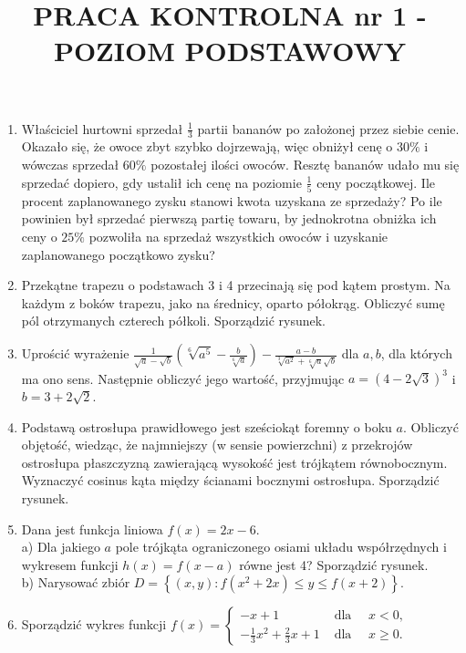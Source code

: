 \documentclass[10pt]{article}
\title{PRACA KONTROLNA nr 1 - POZIOM PODSTAWOWY }
\author{}
\date{}
\begin{document}
\maketitle
\begin{enumerate}
  \item Właściciel hurtowni sprzedał $\frac{1}{3}$ partii bananów po założonej przez siebie cenie. Okazało się, że owoce zbyt szybko dojrzewają, więc obniżył cenę o $30 \%$ i wówczas sprzedał $60 \%$ pozostałej ilości owoców. Resztę bananów udało mu się sprzedać dopiero, gdy ustalił ich cenę na poziomie $\frac{1}{5}$ ceny początkowej. Ile procent zaplanowanego zysku stanowi kwota uzyskana ze sprzedaży? Po ile powinien był sprzedać pierwszą partię towaru, by jednokrotna obniżka ich ceny o $25 \%$ pozwoliła na sprzedaż wszystkich owoców i uzyskanie zaplanowanego początkowo zysku?
  \item Przekątne trapezu o podstawach 3 i 4 przecinają się pod kątem prostym. Na każdym z boków trapezu, jako na średnicy, oparto półokrąg. Obliczyć sumę pól otrzymanych czterech półkoli. Sporządzić rysunek.
  \item Uprościć wyrażenie $\frac{1}{\sqrt{a}-\sqrt{b}}\left(\sqrt[6]{a^{5}}-\frac{b}{\sqrt[6]{a}}\right)-\frac{a-b}{\sqrt[3]{a^{2}}+\sqrt[6]{a} \sqrt{b}}$ dla $a, b$, dla których ma ono sens. Następnie obliczyć jego wartość, przyjmując $a=(4-2 \sqrt{3})^{3}$ i $b=3+2 \sqrt{2}$.
  \item Podstawą ostrosłupa prawidłowego jest sześciokąt foremny o boku $a$. Obliczyć objętość, wiedząc, że najmniejszy (w sensie powierzchni) z przekrojów ostrosłupa płaszczyzną zawierającą wysokość jest trójkątem równobocznym. Wyznaczyć cosinus kąta między ścianami bocznymi ostrosłupa. Sporządzić rysunek.
  \item Dana jest funkcja liniowa $f(x)=2 x-6$.\\
a) Dla jakiego $a$ pole trójkąta ograniczonego osiami układu współrzędnych i wykresem funkcji $h(x)=f(x-a)$ równe jest 4? Sporządzić rysunek.\\
b) Narysować zbiór $D=\left\{(x, y): f\left(x^{2}+2 x\right) \leqslant y \leqslant f(x+2)\right\}$.
  \item Sporządzić wykres funkcji $f(x)= \begin{cases}-x+1 & \text { dla } \quad x<0, \\ -\frac{1}{3} x^{2}+\frac{2}{3} x+1 & \text { dla } \quad x \geqslant 0 .\end{cases}$
\end{enumerate}
\end{document}
